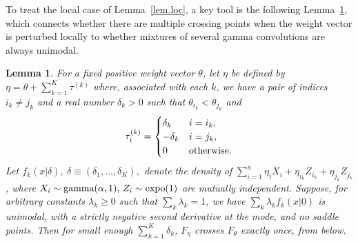 \documentclass[11pt]{article}
\newtheorem{lemma}{\bf Lemma}
\begin{document}
To treat the local case of Lemma~\ref{lem.loc}, a key tool is the following Lemma~\ref{analytic}, which connects whether there are multiple crossing points when the weight vector is perturbed locally to whether mixtures of several gamma convolutions are always unimodal. 

\begin{lemma}
\label{analytic}
For a fixed positive weight vector $\theta$, let $\eta$ be defined by $\eta = \theta +\sum_{k=1}^K \tau^{(k)}$ where, associated with each $k$, we have a pair of indices $i_k\neq j_k$ and a real number $\delta_k>0$ such that $\theta_{i_k}< \theta_{j_k}$ and 
$$\tau^{(k)}_i = \begin{cases} \delta_k & i=i_k,\\
  -\delta_k & i=j_k,\\ 
 0 & {\rm otherwise}.
  \end{cases}
$$ 
Let $f_k(x|\delta),\ \delta\equiv (\delta_1, \ldots, \delta_K),$ denote the density of $\sum_{i=1}^n \eta_i X_i + \eta_{i_k} Z_{i_k} + \eta_{j_k} Z_{j_k}$, where $X_i\sim {\rm gamma}(\alpha, 1),\, Z_i\sim {\rm expo}(1)$ are mutually independent.  Suppose, for arbitrary constants $\lambda_k\geq 0$ such that $\sum_k \lambda_k =1$, we have $\sum_k \lambda_k f_k(x|0)$ is unimodal, with a strictly negative second derivative at the mode, and no saddle points.  Then for small enough $\sum_{k=1}^K \delta_k$, $F_\eta$ crosses $F_\theta$ exactly once, from below. 
\end{lemma}
\end{document}
